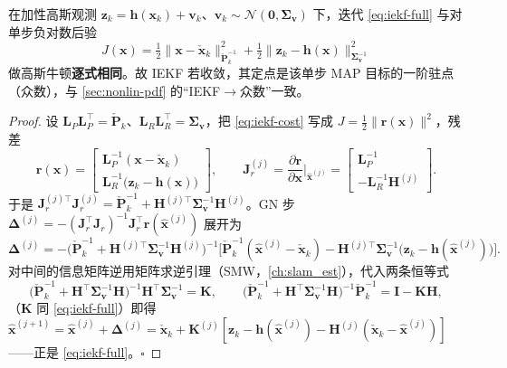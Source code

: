 \begin{theorem}[Bell--Cathey：IEKF $=$ 对单步 MAP 做高斯牛顿]\label{thm:bell-cathey}
在加性高斯观测 $\mathbf{z}_k=\mathbf{h}(\mathbf{x}_k)+\mathbf{v}_k$、$\mathbf{v}_k\sim\mathcal{N}(\boldsymbol{0},\boldsymbol{\Sigma}_{\mathbf{v}})$ 下，迭代 \cref{eq:iekf-full} 与对单步负对数后验
\begin{equation}
  J(\mathbf{x})=\tfrac12\big\|\mathbf{x}-\check{\mathbf{x}}_k\big\|_{\check{\mathbf{P}}_k^{-1}}^2+\tfrac12\big\|\mathbf{z}_k-\mathbf{h}(\mathbf{x})\big\|_{\boldsymbol{\Sigma}_{\mathbf{v}}^{-1}}^2
  \label{eq:iekf-cost}
\end{equation}
做高斯牛顿\textbf{逐式相同}。故 IEKF 若收敛，其定点是该单步 MAP 目标的一阶驻点（众数），与 \cref{sec:nonlin-pdf} 的“IEKF$\to$众数”一致\cite{bell1993iterated,barfoot2024state}。
\end{theorem}
\begin{proof}
设 $\mathbf{L}_P\mathbf{L}_P^\top=\check{\mathbf{P}}_k$、$\mathbf{L}_R\mathbf{L}_R^\top=\boldsymbol{\Sigma}_{\mathbf{v}}$，把 \cref{eq:iekf-cost} 写成 $J=\tfrac12\|\mathbf{r}(\mathbf{x})\|^2$，残差
\[
  \mathbf{r}(\mathbf{x})=\begin{bmatrix}\mathbf{L}_P^{-1}(\mathbf{x}-\check{\mathbf{x}}_k)\\ \mathbf{L}_R^{-1}\big(\mathbf{z}_k-\mathbf{h}(\mathbf{x})\big)\end{bmatrix},\qquad
  \mathbf{J}_r^{(j)}=\frac{\partial\mathbf{r}}{\partial\mathbf{x}}\Big|_{\hat{\mathbf{x}}^{(j)}}=\begin{bmatrix}\mathbf{L}_P^{-1}\\ -\mathbf{L}_R^{-1}\mathbf{H}^{(j)}\end{bmatrix}.
\]
于是 $\mathbf{J}_r^{(j)\top}\mathbf{J}_r^{(j)}=\check{\mathbf{P}}_k^{-1}+\mathbf{H}^{(j)\top}\boldsymbol{\Sigma}_{\mathbf{v}}^{-1}\mathbf{H}^{(j)}$。GN 步 $\boldsymbol{\Delta}^{(j)}=-(\mathbf{J}_r^\top\mathbf{J}_r)^{-1}\mathbf{J}_r^\top\mathbf{r}(\hat{\mathbf{x}}^{(j)})$ 展开为
\[
  \boldsymbol{\Delta}^{(j)}=-\big(\check{\mathbf{P}}_k^{-1}+\mathbf{H}^{(j)\top}\boldsymbol{\Sigma}_{\mathbf{v}}^{-1}\mathbf{H}^{(j)}\big)^{-1}\Big[\check{\mathbf{P}}_k^{-1}(\hat{\mathbf{x}}^{(j)}-\check{\mathbf{x}}_k)-\mathbf{H}^{(j)\top}\boldsymbol{\Sigma}_{\mathbf{v}}^{-1}\big(\mathbf{z}_k-\mathbf{h}(\hat{\mathbf{x}}^{(j)})\big)\Big].
\]
对中间的信息矩阵逆用矩阵求逆引理（SMW，\cref{ch:slam_est}），代入两条恒等式
\[
  \big(\check{\mathbf{P}}_k^{-1}+\mathbf{H}^\top\boldsymbol{\Sigma}_{\mathbf{v}}^{-1}\mathbf{H}\big)^{-1}\mathbf{H}^\top\boldsymbol{\Sigma}_{\mathbf{v}}^{-1}=\mathbf{K},\qquad
  \big(\check{\mathbf{P}}_k^{-1}+\mathbf{H}^\top\boldsymbol{\Sigma}_{\mathbf{v}}^{-1}\mathbf{H}\big)^{-1}\check{\mathbf{P}}_k^{-1}=\mathbf{I}-\mathbf{K}\mathbf{H},
\]
（$\mathbf{K}$ 同 \cref{eq:iekf-full}）即得 $\hat{\mathbf{x}}^{(j+1)}=\hat{\mathbf{x}}^{(j)}+\boldsymbol{\Delta}^{(j)}=\check{\mathbf{x}}_k+\mathbf{K}^{(j)}[\mathbf{z}_k-\mathbf{h}(\hat{\mathbf{x}}^{(j)})-\mathbf{H}^{(j)}(\check{\mathbf{x}}_k-\hat{\mathbf{x}}^{(j)})]$——正是 \cref{eq:iekf-full}。\hfill$\square$
\end{proof}

